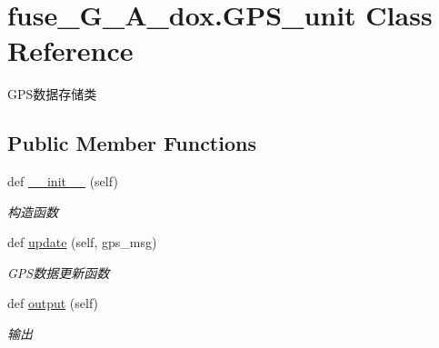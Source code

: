 \hypertarget{classfuse___g___a__dox_1_1_g_p_s__unit}{}\section{fuse\+\_\+\+G\+\_\+\+A\+\_\+dox.\+G\+P\+S\+\_\+unit Class Reference}
\label{classfuse___g___a__dox_1_1_g_p_s__unit}


G\+P\+S数据存储类  


\subsection*{Public Member Functions}
\begin{DoxyCompactItemize}
\item 
def \hyperlink{classfuse___g___a__dox_1_1_g_p_s__unit_a1ee1c5d52b638164821db317a238df69}{\+\_\+\+\_\+init\+\_\+\+\_\+} (self)
\begin{DoxyCompactList}\small\item\em 构造函数 \end{DoxyCompactList}\item 
def \hyperlink{classfuse___g___a__dox_1_1_g_p_s__unit_acc33497e0247428c5c90fe1d0f36d546}{update} (self, gps\+\_\+msg)
\begin{DoxyCompactList}\small\item\em G\+P\+S数据更新函数 \end{DoxyCompactList}\item 
def \hyperlink{classfuse___g___a__dox_1_1_g_p_s__unit_a8eac802afb7e54364521bda5e3fe995f}{output} (self)
\begin{DoxyCompactList}\small\item\em 输出 \end{DoxyCompactList}\end{DoxyCompactItemize}

